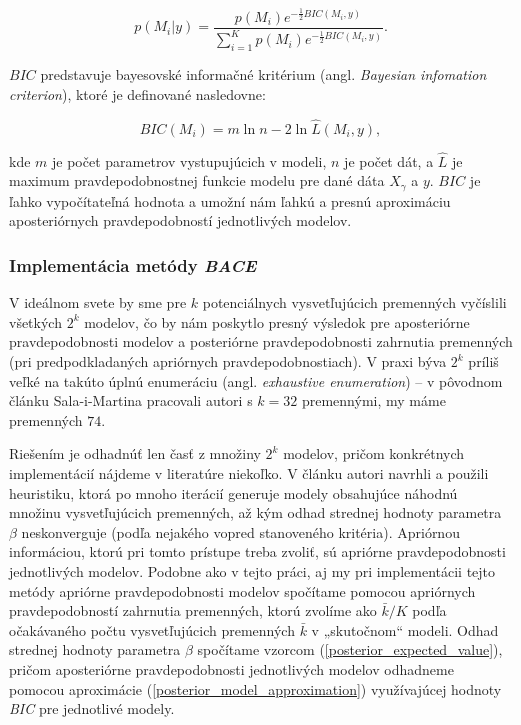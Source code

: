 \begin{equation} \label{posterior_model_approximation}
        p(M_i | y) = \frac{p(M_i) e^{-\frac{1}{2}BIC(M_i, y)}}{\sum_{i = 1}^{K} p(M_i) e^{-\frac{1}{2}BIC(M_i, y)}}.
\end{equation}

\(BIC\) predstavuje bayesovské informačné kritérium (angl. \emph{Bayesian infomation criterion}), ktoré je definované nasledovne:

\[
    BIC(M_i) = m \ln{n} - 2 \ln{\hat{L}(M_i, y)},
\]

kde \( m \) je počet parametrov vystupujúcich v modeli, \(n\) je počet dát,
a \(\hat{L}\) je maximum pravdepodobnostnej funkcie modelu pre dané dáta \(X_{\gamma}\) a \(y\).
\(BIC\) je ľahko vypočítateľná hodnota a umožní nám ľahkú a presnú aproximáciu aposteriórnych pravdepodobností jednotlivých modelov.

\subsubsection{Implementácia metódy \emph{BACE}}

V ideálnom svete by sme pre \(k\) potenciálnych vysvetľujúcich premenných vyčíslili všetkých \(2^k\) modelov,
čo by nám poskytlo presný výsledok pre aposteriórne pravdepodobnosti modelov a posteriórne pravdepodobnosti zahrnutia premenných (pri predpodkladaných apriórnych pravdepodobnostiach).
V praxi býva \(2^k\) príliš veľké na takúto úplnú enumeráciu (angl. \emph{exhaustive enumeration}) – v pôvodnom článku Sala-i-Martina pracovali autori s \(k = 32\) premennými, my máme premenných \(74\).

Riešením je odhadnúť len časť z množiny \(2^k\) modelov, pričom konkrétnych implementácií nájdeme v literatúre niekoľko.
V článku \cite{sala-i-martin} autori navrhli a použili heuristiku, ktorá po mnoho iterácií generuje modely obsahujúce náhodnú množinu vysvetľujúcich premenných,
až kým odhad strednej hodnoty parametra \(\beta\) neskonverguje (podľa nejakého vopred stanoveného kritéria).
Apriórnou informáciou, ktorú pri tomto prístupe treba zvoliť, sú apriórne pravdepodobnosti jednotlivých modelov.
Podobne ako v tejto práci, aj my pri implementácii tejto metódy apriórne pravdepodobnosti modelov spočítame pomocou apriórnych pravdepodobností zahrnutia premenných,
ktorú zvolíme ako \(\bar{k}/K\) podľa očakávaného počtu vysvetľujúcich premenných \(\bar{k}\) v „skutočnom“ modeli.
Odhad strednej hodnoty parametra \(\beta\) spočítame vzorcom (\ref{posterior_expected_value}),
pričom aposteriórne pravdepodobnosti jednotlivých modelov odhadneme pomocou aproximácie (\ref{posterior_model_approximation}) využívajúcej hodnoty \emph{BIC} pre jednotlivé modely.

